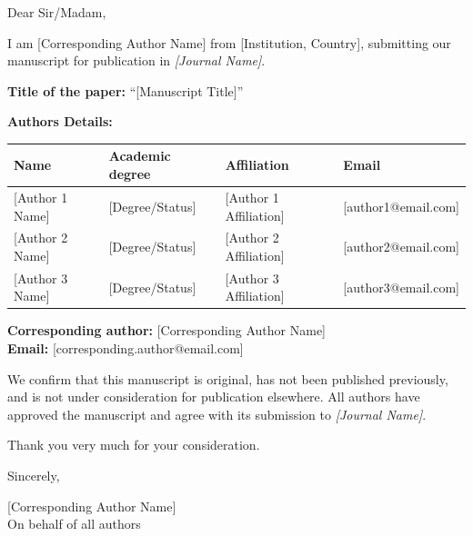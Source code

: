 \documentclass[11pt,a4paper]{article}
\newcommand{\placeholder}[1]{\textnormal{[#1]}}
\begin{document}
Dear Sir/Madam,

I am \placeholder{Corresponding Author Name} from \placeholder{Institution, Country}, submitting our manuscript for publication in \textit{\placeholder{Journal Name}}.

\textbf{Title of the paper:} ``\placeholder{Manuscript Title}''

\textbf{Authors Details:}

{\small
\begin{tabularx}{\textwidth}{>{\raggedright\arraybackslash}p{2.6cm} >{\raggedright\arraybackslash}p{2.4cm} X >{\raggedright\arraybackslash}p{5.0cm}}
\toprule
Name & Academic degree & Affiliation & Email \\
\midrule
\placeholder{Author 1 Name} & \placeholder{Degree/Status} & \placeholder{Author 1 Affiliation} & \placeholder{author1@email.com} \\
\placeholder{Author 2 Name} & \placeholder{Degree/Status} & \placeholder{Author 2 Affiliation} & \placeholder{author2@email.com} \\
\placeholder{Author 3 Name} & \placeholder{Degree/Status} & \placeholder{Author 3 Affiliation} & \placeholder{author3@email.com} \\
\bottomrule
\end{tabularx}
}

\textbf{Corresponding author:} \placeholder{Corresponding Author Name} \\
\textbf{Email:} \placeholder{corresponding.author@email.com}

We confirm that this manuscript is original, has not been published previously, and is not under consideration for publication elsewhere. All authors have approved the manuscript and agree with its submission to \textit{\placeholder{Journal Name}}.

Thank you very much for your consideration.

Sincerely,

\placeholder{Corresponding Author Name} \\
On behalf of all authors
\end{document}
